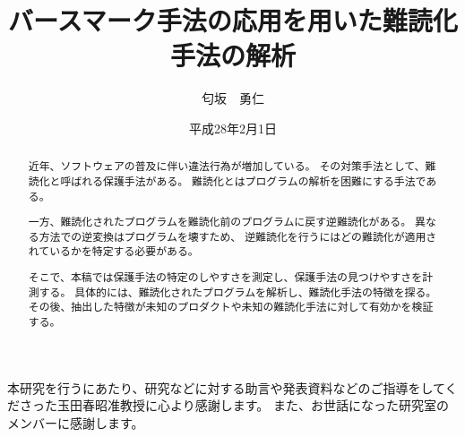 \documentclass[12pt,twoside]{jreport}
\begin{document}
\title{
バースマーク手法の応用を用いた難読化手法の解析
}



\author{匂坂　勇仁}

\date{平成28年2月1日}





\maketitle


\begin{abstract}

近年、ソフトウェアの普及に伴い違法行為が増加している。
その対策手法として、難読化と呼ばれる保護手法がある。
難読化とはプログラムの解析を困難にする手法である。

一方、難読化されたプログラムを難読化前のプログラムに戻す逆難読化がある。
異なる方法での逆変換はプログラムを壊すため、
逆難読化を行うにはどの難読化が適用されているかを特定する必要がある。

そこで、本稿では保護手法の特定のしやすさを測定し、保護手法の見つけやすさを計測する。
具体的には、難読化されたプログラムを解析し、難読化手法の特徴を探る。
その後、抽出した特徴が未知のプロダクトや未知の難読化手法に対して有効かを検証する。

\end{abstract}

\begin{acknowledgments}

本研究を行うにあたり、研究などに対する助言や発表資料などのご指導をしてくださった玉田春昭准教授に心より感謝します。
また、お世話になった研究室のメンバーに感謝します。

\end{acknowledgments}

\tableofcontents       %

%
%
\end{document}
